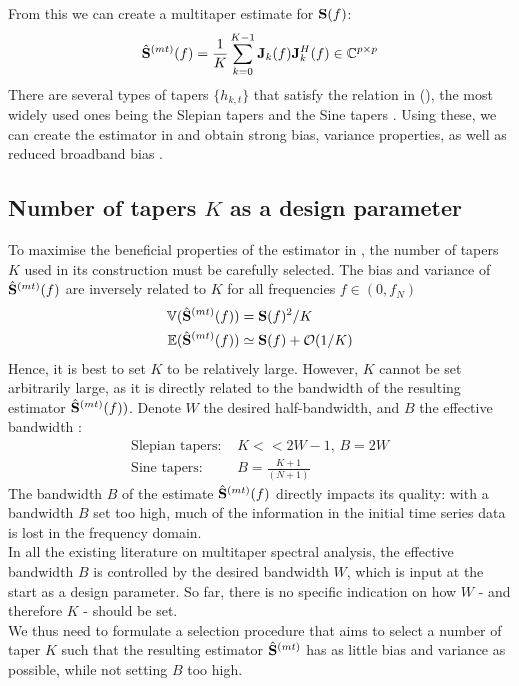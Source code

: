 \documentclass[9pt,journal]{IEEEtran}
\numberwithin{equation}{section}
\newcommand\fnyq{f_N}
\begin{document}
From this we can create a multitaper estimate for $\bold S(f)$:
\begin{equation}
 \hat{\bold S}^{(mt)}(f) = \frac{1}{K} \sum^{K-1}_{k=0}\bold J_k(f)\bold J^H_k(f) \in \mathbb{C}^{p\times p}\label{eq:MTdefinition}
\end{equation}
There are several types of tapers $\{h_{k,t}\}$ that satisfy the relation in  (\cite{Percival1993}), the most widely used ones being the Slepian tapers \cite{Slepian1978} and the Sine tapers \cite{Riedel1995}. Using these, we can create the estimator in   and obtain strong bias, variance properties, as well as reduced broadband bias \cite{Babadi2014}.
\subsection*{Number of tapers $K$ as a design parameter}
To maximise the beneficial properties of the estimator in , the number of tapers $K$ used in its construction must be carefully selected. The bias and variance of $\hat{\bold S}^{(mt)}(f)$ are inversely related to $K$ for all frequencies $f \in (0,\fnyq)$
\begin{align*}
\mathbb{V}(\hat{\bold S}^{(mt)}(f)) &= \bold S(f)^2 /K\\
\mathbb{E}(\hat{\bold S}^{(mt)}(f)) &\simeq   \bold S(f) + \mathcal{O}(1/K)
\end{align*}
Hence, it is best to set $K$ to be relatively large. However, $K$ cannot be set arbitrarily large, as it is directly related to the bandwidth of the resulting estimator $\hat{\bold S}^{(mt)}(f))$. Denote $W$ the desired half-bandwidth, and $B$ the effective bandwidth \cite{Walden1995}:
\begin{align*}
\text{Slepian tapers: } &K << 2W -1 \text{, } B = 2W\\
 \text{Sine tapers: } &B = \frac{K+1}{(N+1)}
\end{align*}
The bandwidth $B$ of the estimate $\hat{\bold S}^{(mt)}(f)$ directly impacts its quality: with a bandwidth $B$ set too high, much of the information in the initial time series data is lost in the frequency domain.\\
{\color{red} In all the existing literature on multitaper spectral analysis}, the effective bandwidth $B$ is controlled by the desired bandwidth $W$, which is input at the start as a design parameter. So far, there is no specific indication on how $W$ - and therefore $K$ - should be set.\\
 We thus need to formulate a selection procedure that aims to select a number of taper $K$ such that the resulting estimator $\hat{\bold S}^{(mt)}$ has as little bias and variance as possible, while not setting $B$ too high. 
\end{document}
